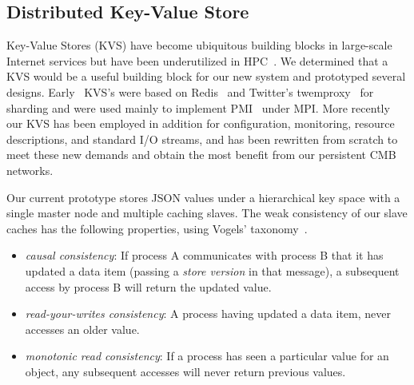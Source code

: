 \subsection{Distributed Key-Value Store}

Key-Value Stores (KVS) have become ubiquitous building blocks in large-scale
Internet services but have been underutilized in HPC~\cite{Wang:2013:USE:2503210.2503239}.
We determined that a KVS would be a
useful building block for our new system and prototyped several designs.
Early \flux\ KVS's were based on Redis~\cite{Redis} and Twitter's
twemproxy~\cite{Twemproxy} for sharding and were used mainly to implement
PMI~\cite{PMI2} under MPI.  More recently our KVS has been employed 
in addition for configuration, monitoring, resource descriptions, and
standard I/O streams, and has been rewritten from scratch to meet these
new demands and obtain the most benefit from our persistent CMB networks.

Our current prototype stores JSON values under a hierarchical key space
with a single master node and multiple caching slaves.  The weak consistency
of our slave caches has the following properties, using Vogels'
taxonomy~\cite{Vogels:2009:EC:1435417.1435432}.

\begin{itemize}
\item{{\em causal consistency}:  If process A communicates with process B
that it has updated a data item (passing a {\em store version} in that
message), a subsequent access by process B will return the updated value.}
\item{{\em read-your-writes consistency}:  A process having updated a
data item, never accesses an older value.}
\item{{\em monotonic read consistency}:  If a process has seen a particular
value for an object, any subsequent accesses will never return previous values.}
\end{itemize}

